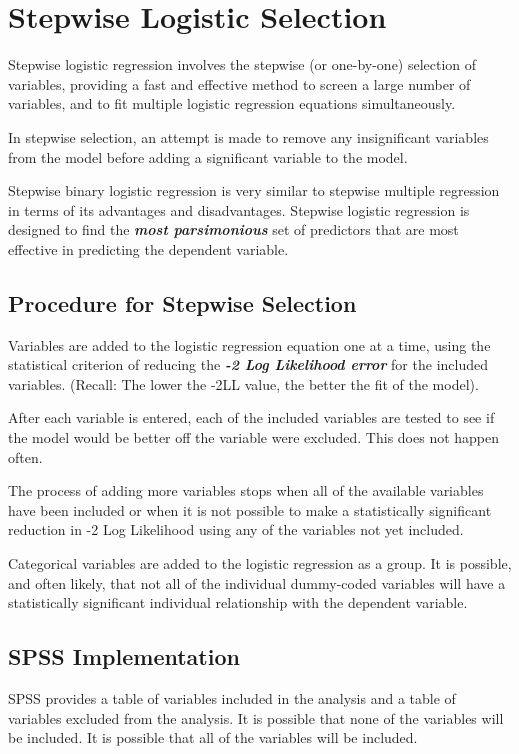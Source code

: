 \documentclass[a4paper,12pt]{article}
\begin{document}
\section{Stepwise Logistic Selection}
Stepwise logistic regression involves the stepwise (or one-by-one) selection of variables,
providing a fast and effective method to screen a large number of variables, and to fit
multiple logistic regression equations simultaneously.

In stepwise selection, an attempt is made to remove any insignificant variables from the model before adding a significant variable to the model.

Stepwise binary logistic regression is very similar to stepwise multiple regression in terms of its advantages and disadvantages. Stepwise logistic regression is designed to find the \textbf{\textit{most parsimonious}} set of predictors that are most effective in predicting the dependent variable.

\subsection{Procedure for Stepwise Selection}
Variables are added to the logistic regression equation one at a time, using the statistical criterion of reducing the \textbf{\textit{-2 Log Likelihood error}} for the included variables. (Recall: The lower the -2LL value, the better the fit of the model).

After each variable is entered, each of the included variables are tested to see if the model would be better off the variable were excluded. This does not happen often.

The process of adding more variables stops when all of the available variables have been included or when it is not possible to make a statistically significant reduction in -2 Log Likelihood using any of the variables not yet included.

Categorical variables are added to the logistic regression as a group. It is possible, and often likely, that not all of the individual dummy-coded variables will have a statistically significant individual relationship with the dependent variable. 
\subsection{SPSS Implementation}
SPSS provides a table of variables included in the analysis and a table of variables excluded from the analysis.  It is possible that none of the variables will be included.  It is possible that all of the variables will be included.
\end{document}
